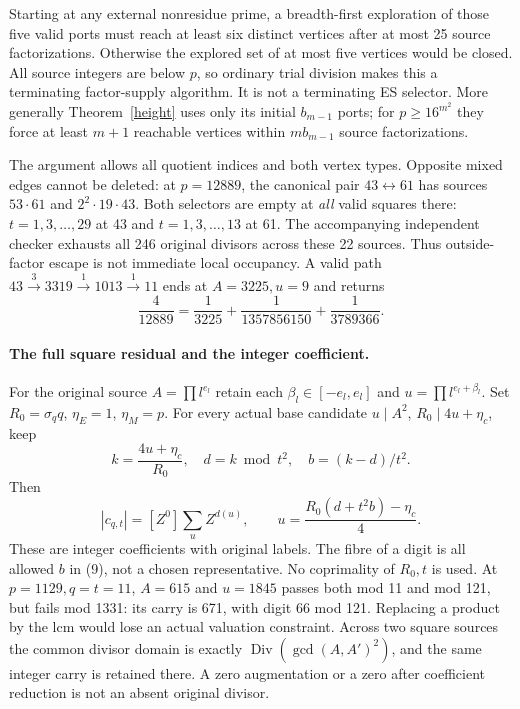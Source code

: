 \documentclass[11pt,reqno]{amsart}
\begin{document}
Starting at any external nonresidue prime, a breadth-first exploration of those
five valid ports must reach at least six distinct vertices after at most 25 source
factorizations. Otherwise the explored set of at most five vertices would be
closed. All source integers are below $p$, so ordinary trial division makes this a
terminating factor-supply algorithm. It is not a terminating ES selector.
More generally Theorem~\ref{height} uses only its initial $b_{m-1}$ ports; for
$p\ge16^{m^2}$ they force at least $m+1$ reachable vertices within $m b_{m-1}$
source factorizations.

The argument allows all quotient indices and both vertex types. Opposite mixed
edges cannot be deleted: at $p=12889$, the canonical pair $43\leftrightarrow61$
has sources $53\cdot61$ and $2^2\cdot19\cdot43$. Both selectors are empty at
\emph{all} valid squares there: $t=1,3,\ldots,29$ at 43 and $t=1,3,\ldots,13$ at 61.
The accompanying independent checker exhausts all 246 original divisors across
these 22 sources. Thus outside-factor escape is not immediate local occupancy.
A valid path $43\xrightarrow{3}3319\xrightarrow{1}1013\xrightarrow{1}11$ ends at
$A=3225,u=9$ and returns
\[
 \frac4{12889}=\frac1{3225}+\frac1{1357856150}+\frac1{3789366}.
\]

\paragraph{The full square residual and the integer coefficient.}
For the original source $A=\prod l^{e_l}$ retain each
$\beta_l\in[-e_l,e_l]$ and $u=\prod l^{e_l+\beta_l}$. Set $R_0=\sigma_q q$,
$\eta_E=1$, $\eta_M=p$. For every actual base candidate
$u\mid A^2$, $R_0\mid4u+\eta_c$, keep
\[
 k=\frac{4u+\eta_c}{R_0},\quad d=k\bmod t^2,\quad b=(k-d)/t^2.
\]
Then
\[
 |c_{q,t}|=[Z^0]\sum_{u}Z^{d(u)},\qquad
 u=\frac{R_0(d+t^2b)-\eta_c}{4}.                           \tag{9}
\]
These are integer coefficients with original labels. The fibre of a digit is all
allowed $b$ in (9), not a chosen representative. No coprimality of $R_0,t$ is used.
At $p=1129,q=t=11$, $A=615$ and $u=1845$ passes both mod 11 and mod 121, but fails
mod 1331: its carry is 671, with digit 66 mod 121. Replacing a product by the lcm would
lose an actual valuation constraint. Across two square sources the common divisor
domain is exactly $\operatorname{Div}(\gcd(A,A')^2)$, and the same integer carry is
retained there. A zero augmentation or a zero after coefficient reduction is not
an absent original divisor.
\end{document}
